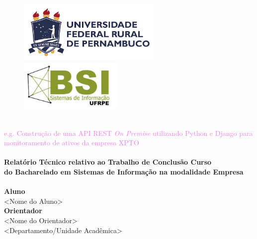 \begin{titlepage}
\begin{center}


\begin{figure}[ht]
		\includegraphics[height=3cm]{images/logo_ufrpe_horizontal.png}
		\hspace{3.5cm}
    	\includegraphics[height=2.5cm]{images/logo_bsi .pdf}
	\end{figure}   

\vspace{1cm}

\textsc{} \\
\small \textcolor{violet}{e.g. Construção de uma API REST \textit{On Premise} utilizando Python e Django para monitoramento de ativos da empresa XPTO}\\[2cm]

\HRule \\[0.4cm]
{\large \bfseries Relatório Técnico relativo ao Trabalho de Conclusão Curso \\
do Bacharelado em Sistemas de Informação na modalidade Empresa \\[0.4cm]}
\HRule 
\\[2cm]

\large\textbf{Aluno}\\
<Nome do Aluno>\\[1cm]

\large\textbf{Orientador}\\
<Nome do Orientador>\\
<Departamento/Unidade Acadêmica>\\[1cm]



\vfill


\end{center}
\end{titlepage}
